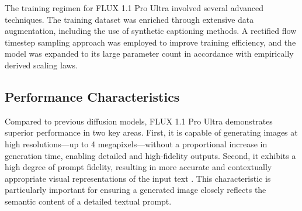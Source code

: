 The training regimen for FLUX 1.1 Pro Ultra involved several advanced techniques. The training dataset was enriched through extensive data augmentation, including the use of synthetic captioning methods. A rectified flow timestep sampling approach was employed to improve training efficiency, and the model was expanded to its large parameter count in accordance with empirically derived scaling laws.

\subsection{Performance Characteristics}
Compared to previous diffusion models, FLUX 1.1 Pro Ultra demonstrates superior performance in two key areas. First, it is capable of generating images at high resolutions—up to 4 megapixels—without a proportional increase in generation time, enabling detailed and high-fidelity outputs. Second, it exhibits a high degree of prompt fidelity, resulting in more accurate and contextually appropriate visual representations of the input text \cite{blackforestlabs2024flux}. This characteristic is particularly important for ensuring a generated image closely reflects the semantic content of a detailed textual prompt.
